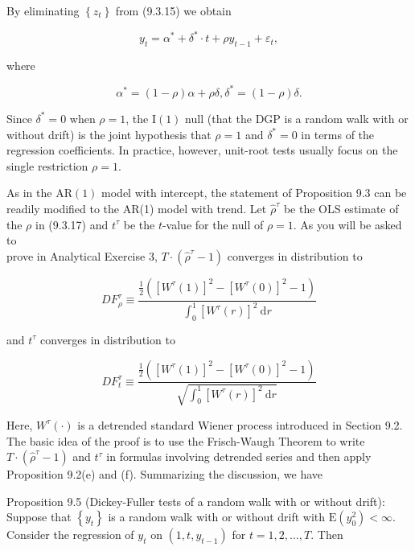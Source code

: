 \documentclass[10pt]{article}
\begin{document}
By eliminating $\left\{z_{t}\right\}$ from (9.3.15) we obtain


\begin{equation*}
y_{t}=\alpha^{*}+\delta^{*} \cdot t+\rho y_{t-1}+\varepsilon_{t}, \tag{9.3.17}
\end{equation*}


where


\begin{equation*}
\alpha^{*}=(1-\rho) \alpha+\rho \delta, \delta^{*}=(1-\rho) \delta . \tag{9.3.18}
\end{equation*}


Since $\delta^{*}=0$ when $\rho=1$, the $\mathrm{I}(1)$ null (that the DGP is a random walk with or without drift) is the joint hypothesis that $\rho=1$ and $\delta^{*}=0$ in terms of the regression coefficients. In practice, however, unit-root tests usually focus on the single restriction $\rho=1$.

As in the $\mathrm{AR}(1)$ model with intercept, the statement of Proposition 9.3 can be readily modified to the AR(1) model with trend. Let $\hat{\rho}^{\tau}$ be the OLS estimate of the $\rho$ in (9.3.17) and $t^{\tau}$ be the $t$-value for the null of $\rho=1$. As you will be asked to\\
prove in Analytical Exercise 3, $T \cdot\left(\hat{\rho}^{\tau}-1\right)$ converges in distribution to


\begin{equation*}
D F_{\rho}^{\tau} \equiv \frac{\frac{1}{2}\left(\left[W^{\tau}(1)\right]^{2}-\left[W^{\tau}(0)\right]^{2}-1\right)}{\int_{0}^{1}\left[W^{\tau}(r)\right]^{2} \mathrm{~d} r} \tag{9.3.19}
\end{equation*}


and $t^{\tau}$ converges in distribution to


\begin{equation*}
D F_{t}^{\tau} \equiv \frac{\frac{1}{2}\left(\left[W^{\tau}(1)\right]^{2}-\left[W^{\tau}(0)\right]^{2}-1\right)}{\sqrt{\int_{0}^{1}\left[W^{\tau}(r)\right]^{2} \mathrm{~d} r}} \tag{9.3.20}
\end{equation*}


Here, $W^{\tau}(\cdot)$ is a detrended standard Wiener process introduced in Section 9.2. The basic idea of the proof is to use the Frisch-Waugh Theorem to write $T \cdot\left(\hat{\rho}^{\tau}-1\right)$ and $t^{\tau}$ in formulas involving detrended series and then apply Proposition 9.2(e) and (f). Summarizing the discussion, we have

Proposition 9.5 (Dickey-Fuller tests of a random walk with or without drift): Suppose that $\left\{y_{t}\right\}$ is a random walk with or without drift with $\mathrm{E}\left(y_{0}^{2}\right)<\infty$. Consider the regression of $y_{t}$ on $\left(1, t, y_{t-1}\right)$ for $t=1,2, \ldots, T$. Then
\end{document}
